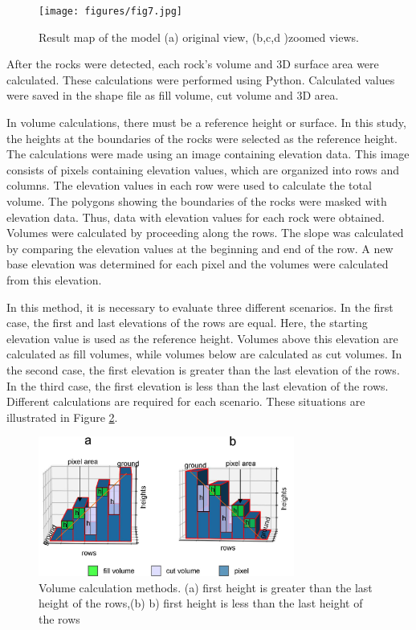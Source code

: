 \documentclass[a4paper,fleqn]{cas-sc}
\begin{document}
\begin{figure}
	\centering
	\texttt{[image: figures/fig7.jpg]}
	\caption{Result map of the model (a) original view, (b,c,d )zoomed views.}
	\label{fig:Figure7}
\end{figure}

After the rocks were detected, each rock's volume and 3D surface area were calculated. These calculations were performed using Python. Calculated values were saved in the shape file as fill volume, cut volume and 3D area.

In volume calculations, there must be a reference height or surface. In this study, the heights at the boundaries of the rocks were selected as the reference height. The calculations were made using an image containing elevation data. This image consists of pixels containing elevation values, which are organized into rows and columns. The elevation values in each row were used to calculate the total volume. The polygons showing the boundaries of the rocks were masked with elevation data. Thus, data with elevation values for each rock were obtained. Volumes were calculated by proceeding along the rows. The slope was calculated by comparing the elevation values at the beginning and end of the row. A new base elevation was determined for each pixel and the volumes were calculated from this elevation.

In this method, it is necessary to evaluate three different scenarios. In the first case, the first and last elevations of the rows are equal. Here, the starting elevation value is used as the reference height. Volumes above this elevation are calculated as fill volumes, while volumes below are calculated as cut volumes. In the second case, the first elevation is greater than the last elevation of the rows. In the third case, the first elevation is less than the last elevation of the rows. Different calculations are required for each scenario. These situations are illustrated in Figure \ref{fig:Figure8}.
\begin{figure}
	\centering
	\includegraphics[width=0.75\textwidth]{figures/fig8.jpg}
	\caption{Volume calculation methods. (a) first height is greater than the last height of the rows,(b) b) first height is less than the last height of the rows}
	\label{fig:Figure8}
\end{figure}
\end{document}
